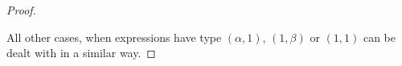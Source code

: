 \begin{proof}
\begin{itemize}
\end{itemize}
All other cases, when expressions have type $(\alpha,1)$, $(1,\beta)$ or $(1,1)$ can be dealt with in a similar way.
\end{proof}

